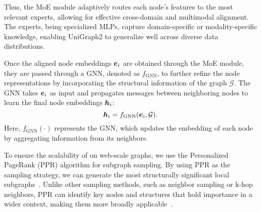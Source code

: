 Thus, the MoE module adaptively routes each node’s features to the most relevant experts, allowing for effective cross-domain and multimodal alignment. The experts, being specialized MLPs, capture domain-specific or modality-specific knowledge, enabling UniGraph2 to generalize well across diverse data distributions.


Once the aligned node embeddings \( {\bm{e}}_i \) are obtained through the MoE module, they are passed through a GNN, denoted as \( f_{\text{GNN}} \), to further refine the node representations by incorporating the structural information of the graph \( \mathcal{G} \). The GNN takes \( {\bm{e}}_i \) as input and propagates messages between neighboring nodes to learn the final node embeddings \( {\bm{h}}_i \):
\begin{equation}
    {\bm{h}}_i = f_{\text{GNN}}({\bm{e}}_i, \mathcal{G}).
\end{equation}
Here, \( f_{\text{GNN}}(\cdot) \) represents the GNN, which updates the embedding of each node by aggregating information from its neighbors. 

To ensure the scalability of \model on web-scale graphs, we use the Personalized PageRank (PPR) algorithm for subgraph sampling. By using PPR as the sampling strategy, we can generate the most structurally significant local subgraphs~\cite{bianchini2005inside,gasteiger2018predict}. Unlike other sampling methods, such as neighbor sampling or k-hop neighbors, PPR can identify key nodes and structures that hold importance in a wider context, making them more broadly applicable~\cite{lofgren2016personalized,he2024unigraphlearningunifiedcrossdomain}.


